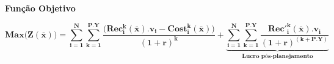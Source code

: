 \documentclass{article}
\newcommand{\topico}[1]{
  \vspace{20pt}
  {\Large \bf #1 }
}
\begin{document}
\topico{Função Objetivo}
\begin{equation}
  \nonumber
    \bm{
	  Max \big(Z(\overline{x})\big) =
	    \sum_{i=1}^N
	    \sum_{k=1}^{P.Y}
	    \frac
		  {\big( Rec_i^k(\overline{x}).v_i - Cost_i^k(\overline{x}) \big)}
	      {(1+r)^k}
		+
	    \underbrace{
	    \sum_{i=1}^N
	    \sum_{k=1}^{P.Y}
	    \frac
		  {{Rec'}_i^k(\overline{x}).v_i}
	      {(1+r)^{(k+P.Y)}}
		}_{\text{Lucro pós-planejamento}}
	}
  \label{eq:budget}
\end{equation}

\vfill
\end{document}
